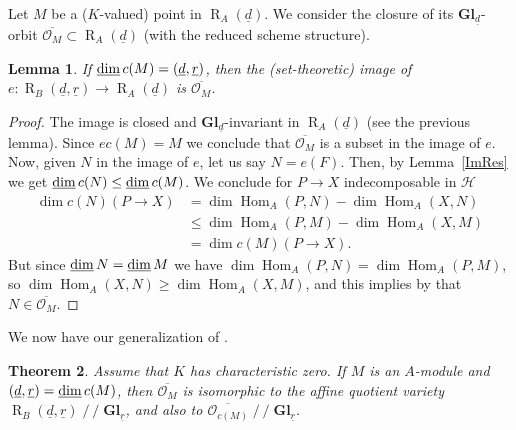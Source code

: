 \documentclass[11pt,a4paper]{amsart}
\theoremstyle{plain}
\newtheorem{thm}{Theorem}[section]
\newtheorem{lem}[thm]{Lemma}
\theoremstyle{definition}
\begin{document}
Let $M$ be a ($K$-valued) point in ${\operatorname{R}_A(\underline{d})}$. We consider the closure of its ${\mathbf{Gl}_{\underline{d }}}$-orbit $\overline{{\mathcal{O}}_M} \subset {\operatorname{R}_A(\underline{d})}$ (with the reduced scheme structure). 

\begin{lem} If $\operatorname{\rm \underline{dim}} {c} (M)= ({\underline{d}} , {\underline{r}} )$,
then the (set-theoretic) image of ${e} \colon {\operatorname{R}_B(\underline{d},\underline{r})} \to {\operatorname{R}_A(\underline{d})}$ is $\overline{{\mathcal{O}}_M}$. 
\end{lem}

\begin{proof} 
The image is closed and ${\mathbf{Gl}_{\underline{d }}}$-invariant in ${\operatorname{R}_A(\underline{d})} $ (see the previous lemma). 
Since ${e} {c}(M) =M$ we conclude that 
$\overline{{\mathcal{O}}_M}$ is a subset in the image of ${e} $. 
Now, given $N$ in the image of ${e} $, let us say $N={e} (F)$. 
Then, by Lemma~\ref{ImRes} we get $\operatorname{\rm \underline{dim}} {c} (N) \leq \operatorname{\rm \underline{dim}} {c} (M)$. 
We conclude for $P\to X$ indecomposable in ${\mathcal{H}} $ 
\[
\begin{aligned}
\dim {c} (N) (P\to X) & =\dim \operatorname{Hom}_A (P,N) - \dim \operatorname{Hom}_A (X,N) \\
                          &\leq \dim \operatorname{Hom}_A(P,M) - \dim \operatorname{Hom}_A (X,M) \\
                          &= \dim {c} (M) (P\to X).
\end{aligned}
\]
But since $\operatorname{\rm \underline{dim}} N= \operatorname{\rm \underline{dim}} M$ we have $\dim \operatorname{Hom}_A (P,N)=\dim \operatorname{Hom}_A (P,M)$, 
so $\dim \operatorname{Hom}_A (X,N)\geq \dim \operatorname{Hom}_A (X,M)$,
and this implies by \cite{Zw5} that $N\in \overline{{\mathcal{O}}_M}$.
\end{proof}

We now have our generalization of \cite[Theorem 1.2]{CFR}.

\begin{thm}
\label{CFR-Thm} 
Assume that $K$ has characteristic zero. 
If $M$ is an $A$-module and $({\underline{d}}, {\underline{r}} ) =\operatorname{\rm \underline{dim}} {c} (M)$,
then $\overline{\mathcal{O}_M}$ is isomorphic to the affine quotient variety
${\operatorname{R}_B(\underline{d},\underline{r})}\operatorname{/\!\!/}{\mathbf{Gl}_{\underline{r}}}$, and also to $\overline{{\mathcal{O}}_{c(M)}} \operatorname{/\!\!/} {\mathbf{Gl}_{\underline{r}}}$.
\end{thm}
\end{document}

